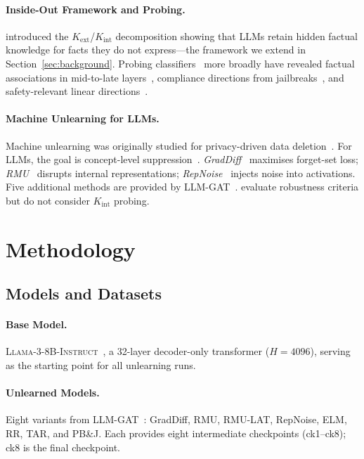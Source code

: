 \documentclass[11pt]{article}
\begin{document}
\paragraph{Inside-Out Framework and Probing.}
\citet{gekhman2025insideout} introduced the $K_\text{ext}$/$K_\text{int}$
decomposition showing that LLMs retain hidden factual knowledge for facts they
do not express---the framework we extend in Section~\ref{sec:background}.
Probing classifiers~\citep{alain2017understanding} more broadly have revealed
factual associations in mid-to-late layers~\citep{meng2022locating}, compliance
directions from jailbreaks~\citep{levi2025jailbreak}, and safety-relevant linear
directions~\citep{zou2023representation}.

\paragraph{Machine Unlearning for LLMs.}
Machine unlearning was originally studied for privacy-driven data
deletion~\citep{cao2015towards}.
For LLMs, the goal is concept-level suppression~\citep{liu2024rethinking,eldan2023whos}.
\emph{GradDiff}~\citep{yao2023large} maximises forget-set loss;
\emph{RMU}~\citep{li2024wmdp} disrupts internal representations;
\emph{RepNoise}~\citep{rosati2024representation} injects noise into activations.
Five additional methods are provided by LLM-GAT~\citep{llmgat2024}.
\citet{lynch2024eight} evaluate robustness criteria but do not consider
$K_\text{int}$ probing.

\section{Methodology}
\label{sec:method}

\subsection{Models and Datasets}

\paragraph{Base Model.}
\textsc{Llama-3-8B-Instruct}~\citep{dubey2024llama}, a 32-layer decoder-only
transformer ($H=4096$), serving as the starting point for all unlearning runs.

\paragraph{Unlearned Models.}
Eight variants from LLM-GAT~\citep{llmgat2024,che2025model}: GradDiff, RMU,
RMU-LAT, RepNoise, ELM, RR, TAR, and PB\&J.
Each provides eight intermediate checkpoints (ck1--ck8); ck8 is the final
checkpoint.
\end{document}
